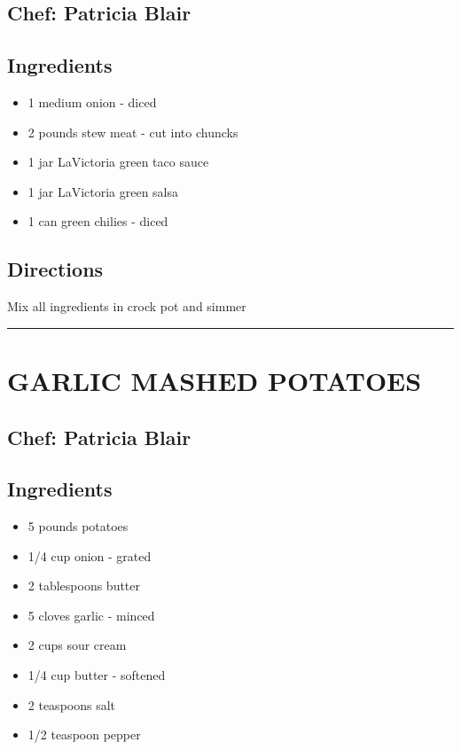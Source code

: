 \documentclass[
]{book}
\providecommand{\tightlist}{%
  \setlength{\itemsep}{0pt}\setlength{\parskip}{0pt}}
\begin{document}
\hypertarget{chef-patricia-blair-7}{%
\subsection*{Chef: Patricia Blair}\label{chef-patricia-blair-7}}


\hypertarget{ingredients-29}{%
\subsection*{Ingredients}\label{ingredients-29}}


\begin{itemize}
\tightlist
\item
  1 medium onion - diced
\item
  2 pounds stew meat - cut into chuncks
\item
  1 jar LaVictoria green taco sauce
\item
  1 jar LaVictoria green salsa
\item
  1 can green chilies - diced
\end{itemize}

\hypertarget{directions-29}{%
\subsection*{Directions}\label{directions-29}}


Mix all ingredients in crock pot and simmer

\begin{center}\rule{0.5\linewidth}{0.5pt}\end{center}

\hypertarget{garlic-mashed-potatoes}{%
\section*{GARLIC MASHED POTATOES}\label{garlic-mashed-potatoes}}


\hypertarget{chef-patricia-blair-8}{%
\subsection*{Chef: Patricia Blair}\label{chef-patricia-blair-8}}


\hypertarget{ingredients-30}{%
\subsection*{Ingredients}\label{ingredients-30}}


\begin{itemize}
\tightlist
\item
  5 pounds potatoes
\item
  1/4 cup onion - grated
\item
  2 tablespoons butter
\item
  5 cloves garlic - minced
\item
  2 cups sour cream
\item
  1/4 cup butter - softened
\item
  2 teaspoons salt
\item
  1/2 teaspoon pepper
\end{itemize}
\end{document}
